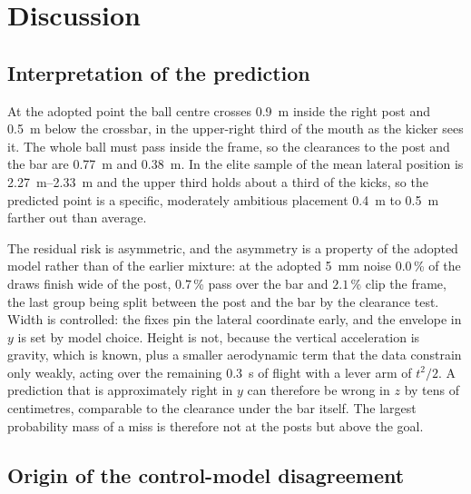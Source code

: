 \section{Discussion}
\label{sec:discussion}

\subsection{Interpretation of the prediction}
\label{sec:disc-meaning}

At the adopted point the ball centre crosses \SI{0.9}{m} inside the right post
and \SI{0.5}{m} below the crossbar, in the upper-right third of the mouth as
the kicker sees it. The whole ball must pass inside the frame, so the
clearances to the post and the bar are \SI{0.77}{m} and \SI{0.38}{m}. In the elite sample of \citep{higueras2020} the mean lateral
position is \SIrange{2.27}{2.33}{m} and the upper third holds about a third of
the kicks, so the predicted point is a specific, moderately ambitious
placement \SI{0.4}{m} to \SI{0.5}{m} farther out than average.

The residual risk is asymmetric, and the asymmetry is a property of the adopted
model rather than of the earlier mixture: at the adopted \SI{5}{mm} noise
$0.0$\,\% of the draws finish wide of the post, $0.7$\,\%
pass over the bar and $2.1$\,\% clip the frame, the last group being
split between the post and the bar by the clearance test. Width is controlled: the
fixes pin the lateral coordinate early, and the envelope in $y$ is set by
model choice. Height is not, because the vertical acceleration is gravity,
which is known, plus a smaller aerodynamic term that the data constrain only
weakly, acting over the remaining \SI{0.3}{s} of flight with a lever arm of
$t^2/2$. A prediction that is approximately right in $y$ can therefore be
wrong in $z$ by tens of centimetres, comparable to the clearance under the bar
itself. The largest probability mass of a miss is therefore not at the posts
but above the goal.

\subsection{Origin of the control-model disagreement}
\label{sec:disc-disagreement}

